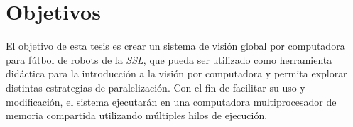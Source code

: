
\section{Objetivos}

\label{objetivos}

El objetivo de esta tesis es crear un sistema de visión global por computadora
para fútbol de robots de la \emph{SSL}, que pueda ser utilizado como herramienta
didáctica para la introducción a la visión por computadora y permita explorar
distintas estrategias de paralelización. Con el fin de facilitar su uso y
modificación, el sistema ejecutarán en una computadora multiprocesador de
memoria compartida utilizando múltiples hilos de ejecución.
